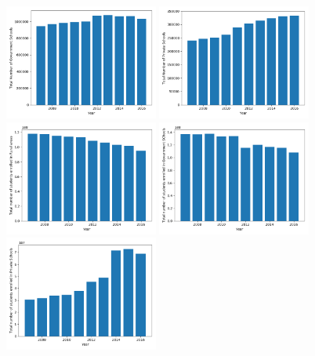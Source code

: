 \documentclass[twoside]{article}
\begin{document}
\begin{figure}[h]
    \centering
    \includegraphics[width=0.45\textwidth]{GovtSchoolE.png}
    \includegraphics[width=0.45\textwidth]{PrvtSchoolE.png}
    \includegraphics[width=0.45\textwidth]{RuralEnrolmentGovtE.png}
    \includegraphics[width=0.45\textwidth]{TotalEnrolmentGovtE.png}
    \includegraphics[width=0.45\textwidth]{TotalEnrolmentPrvtE.png}

\end{figure}
\end{document}
